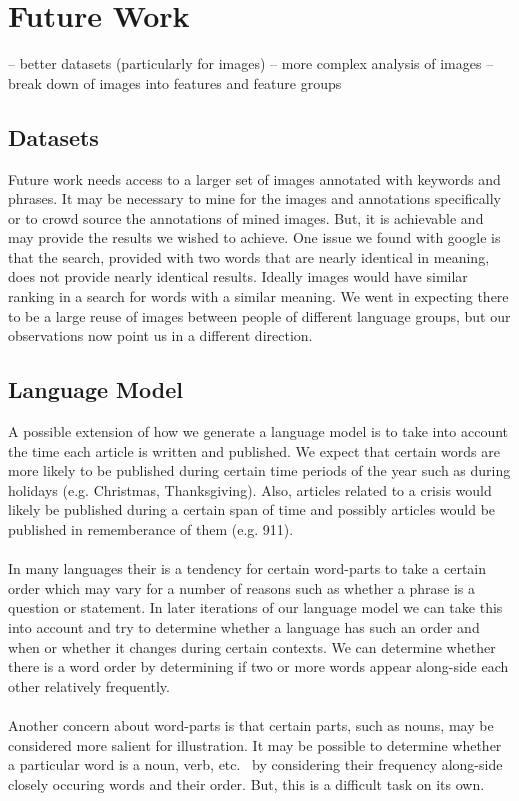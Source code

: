 \documentclass[12pt]{article}
\begin{document}
\section{Future Work}
-- better datasets (particularly for images)
-- more complex analysis of images
-- break down of images into features and feature groups

\subsection{Datasets}
Future work needs access to a larger set of images annotated with keywords and phrases. It may be necessary to mine 
for the images and annotations specifically or to crowd source the annotations of mined images. But, it is achievable 
and may provide the results we wished to achieve. One issue we found with google is that the search, provided with two 
words that are nearly identical in meaning, does not provide nearly identical results. Ideally images would have 
similar ranking in a search for words with a similar meaning. We went in expecting there to be a large reuse of images 
between people of different language groups, but our observations now point us in a different direction.

\subsection{Language Model}
A possible extension of how we generate a language model is to take into account the time each article is written and 
published. We expect that certain words are more likely to be published during certain time periods of the year such as 
during holidays (e.g. Christmas, Thanksgiving). Also, articles related to a crisis would likely be published during a 
certain span of time and possibly articles would be published in rememberance of them (e.g. 911).
\paragraph{}
In many languages their is a tendency for certain word-parts to take a certain order which may vary for a number of 
reasons such as whether a phrase is a question or statement. In later iterations of our language model we can take 
this into account and try to determine whether a language has such an order and when or whether it changes during 
certain contexts. We can determine whether there is a word order by determining if two or more words appear 
along-side each other relatively frequently.
\paragraph{}
Another concern about word-parts is that certain parts, such as nouns, may be considered more salient for illustration. 
It may be possible to determine whether a particular word is a noun, verb, etc. \ by considering their frequency 
along-side closely occuring words and their order. But, this is a difficult task on its own.
\end{document}
